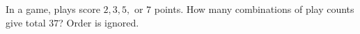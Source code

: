 In a game, plays score $2,3,5,$ or $7$ points. How many combinations of play counts give total $37$? Order is ignored.
